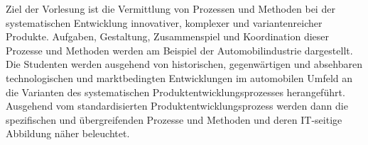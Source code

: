 \begin{course}
\begin{content}
Ziel der Vorlesung ist die Vermittlung von Prozessen und Methoden bei der systematischen Entwicklung innovativer, komplexer und variantenreicher Produkte. Aufgaben, Gestaltung, Zusammenspiel und Koordination dieser Prozesse und Methoden werden am Beispiel der Automobilindustrie dargestellt.\newline
Die Studenten werden ausgehend von historischen, gegenwärtigen und absehbaren technologischen und marktbedingten Entwicklungen im automobilen Umfeld an die Varianten des systematischen Produktentwicklungsprozesses herangeführt. Ausgehend vom standardisierten Produktentwicklungsprozess werden dann die spezifischen und übergreifenden Prozesse und Methoden und deren IT-seitige Abbildung näher beleuchtet.


\end{content}







\end{course}